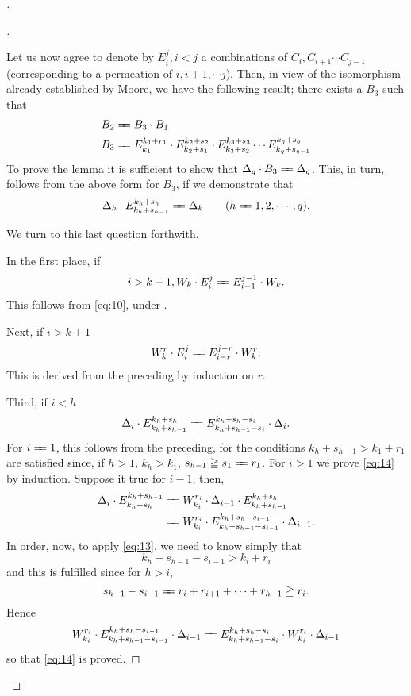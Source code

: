 \documentclass[10pt, twoside]{extarticle}
\def\varequals#1{\mathrel{\leaders\hbox to3pt{$=$\hss}\hskip#1=}}
\newcommand\longeq{\varequals{0.4em}}
\theoremstyle{breaktheorem}
\theoremstyle{mylemma}
\theoremstyle{mydefinition}
\theoremstyle{mycorollary}
\newenvironment{proofnewlineindent}[1][\proofname]{%
  \begin{proof}[\indent#1]$ $\par\nobreak\ignorespaces
}{%
  \end{proof}
}
\begin{document}
\begin{proofnewlineindent}
\begin{proofnewlineindent}
  Let us now agree to denote by \(E_i^j, i<j\) a combinations of \(C_i, C_{i+1} \cdots C_{j-1}\)
  (corresponding to a permeation of \(i, i+1, \cdots j\)). Then, in view of the
  isomorphism already established by Moore, we have the following result;
  there exists a \(B_3\) such that
  \begin{align*}
    B_2 &\longeq B_3 \cdot B_1 \\
    B_3 &\longeq E_{k_1}^{k_1 + r_1} \cdot E_{k_2 + s_1}^{k_2 + s_2} \cdot E_{k_3 + s_2}^{k_3 + s_3} \cdots E_{k_q + s_{q-1}}^{k_q + s_q}
  \end{align*}
  \indent To prove the lemma it is sufficient to show that \(\Delta_q \cdot B_3 \longeq \Delta_q\). This, in
  turn, follows from the above form for \(B_3\), if we demonstrate that
  \begin{equation}
    \label{eq:12}
    \Delta_h \cdot E_{k_h + s_{h-1}}^{k_h + s_h} \longeq \Delta_k \qquad (h\longeq 1, 2, \cdots, q).
  \end{equation}

  \noindent We turn to this last question forthwith.

  In the first place, if
  \[ i > k+1, W_k \cdot E_i^j \longeq E_{i-1}^{j-1} \cdot W_k. \]
  This follows from \eqref{eq:10}, under .

  Next, if \(i>k+1\)
  \begin{equation}
    \label{eq:13}
    W_k^r \cdot E_i^j \longeq E_{i-r}^{j-r} \cdot W_k^r.
  \end{equation}
  This is derived from the preceding by induction on \(r\).

  Third, if \(i < h\)
  \begin{equation}
    \label{eq:14}
    \Delta_i \cdot E_{k_h + s_{h-1}}^{k_h + s_{h}} \longeq E_{k_h + s_{h-1} - s_i}^{k_h + s_h - s_i} \cdot \Delta_i.
  \end{equation}
  For \(i\longeq 1\), this follows from the preceding, for the conditions \(k_h + s_{h-1} > k_1 + r_1\)
  are satisfied since, if \(h > 1\), \(k_h > k_1\), \(s_{h-1} \geqq s_1 \longeq r_1\). For \(i > 1\)
  we prove \eqref{eq:14} by induction. Suppose it true for \(i-1\), then,
  \begin{align*}
    \Delta_i \cdot E_{k_h + s_h}^{k_h + s_{h-1}} &\longeq W_{k_i}^{r_i} \cdot \Delta_{i-1} \cdot E_{k_h + s_{h-1}}^{k_h + s_h} \\
                                                 &\longeq W_{k_i}^{r_i} \cdot E_{k_h + s_{h-1} - s_{i-1}}^{k_h + s_h - s_{i-1}} \cdot \Delta_{i-1}.
  \end{align*}
  In order, now, to apply \eqref{eq:13}, we need to know simply that
  \[k_h + s_{h-1} - s_{i-1} > k_i + r_i\]
  and this is fulfilled since for \(h > i\),
  \[s_{h-1} - s_{i-1} \longeq r_i + r_{i+1} + \cdots + r_{h-1} \geqq r_i.\]
  Hence
  \[W_{k_i}^{r_i} \cdot E_{k_h + s_{h-1} - s_{i-1}}^{k_h + s_h - s_{i-1}} \cdot \Delta_{i-1} \longeq E_{k_h + s_{h-1} - s_i}^{k_h + s_h - s_i} \cdot W_{k_i}^{r_i} \cdot \Delta_{i-1}\]
  so that \eqref{eq:14} is proved.


\end{proofnewlineindent}
\end{proofnewlineindent}
\end{document}
